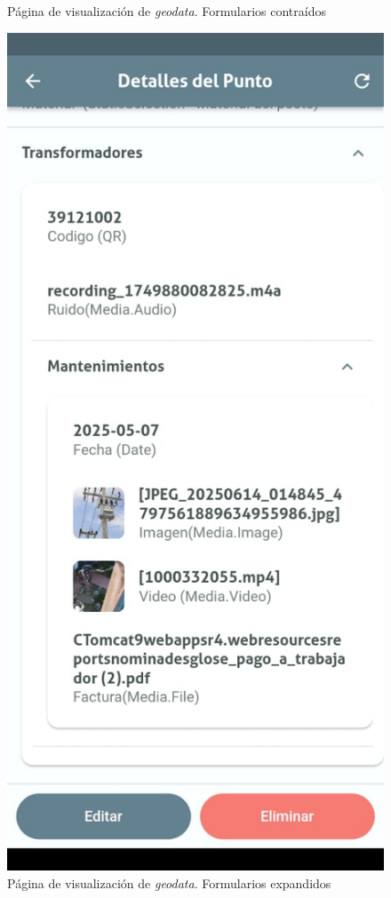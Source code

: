 \documentclass[12pt, a4paper]{book}
\begin{document}
\begin{figure}[H]
\begin{minipage}[b]{0.3\textwidth}
    \caption{Página de visualización de \textit{geodata}. Formularios contraídos}
    \label{fig:geodataview1}
  \end{minipage}
  \hspace{0.02\textwidth}
  \begin{minipage}[b]{0.3\textwidth}
    \centering
    \includegraphics[width=\textwidth]{images/functionality_test/geodata_view2.jpg}
    \caption{Página de visualización de \textit{geodata}. Formularios expandidos}
    \label{fig:geodataview2}
  \end{minipage}
\end{figure}
\end{document}

